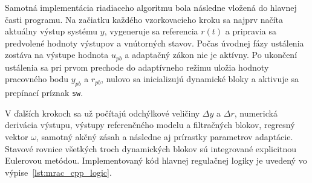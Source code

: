 Samotná implementácia riadiaceho algoritmu bola následne vložená do hlavnej
časti programu. Na začiatku každého vzorkovacieho kroku sa najprv načíta aktuálny
výstup systému $y$, vygeneruje sa referencia $r(t)$ a pripravia sa predvolené
hodnoty výstupov a vnútorných stavov. Počas úvodnej fázy ustálenia zostáva
na výstupe hodnota $u_{pb}$ a adaptačný zákon nie je aktívny. Po ukončení
ustálenia sa pri prvom prechode do adaptívneho režimu uložia hodnoty pracovného
bodu $y_{pb}$ a $r_{pb}$, nulovo sa inicializujú dynamické bloky a aktivuje sa
prepínací príznak \texttt{sw}.

V ďalších krokoch sa už počítajú odchýlkové veličiny $\Delta y$ a $\Delta r$,
numerická derivácia výstupu, výstupy referenčného modelu a filtračných blokov,
regresný vektor $\omega$, samotný akčný zásah a následne aj prírastky parametrov
adaptácie. Stavové rovnice všetkých troch dynamických blokov sú integrované
explicitnou Eulerovou metódou. Implementovaný kód hlavnej regulačnej logiky
je uvedený vo výpise~\ref{lst:mrac_cpp_logic}.

